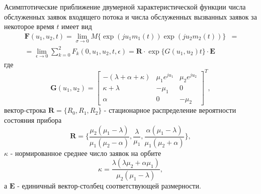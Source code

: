 \begin{theorem}
	Асимптотические приближение двумерной характеристической функции числа обслуженных заявок входящего потока и числа обслуженных вызванных заявок за некоторое время $t$ имеет вид
	\begin{equation*} \label{theorem_twodim}
		\begin{split}
			\boldsymbol{F}(u_{1},u_{2},t) =  \lim_{\sigma \xrightarrow{} 0} M\{\exp(ju_{1}m_{1}(t))\exp(ju_{2}m_{2}(t))\} &= 
			\\
			= \lim_{\epsilon \xrightarrow{} 0} \sum_{k=0}^{2}F_{k}(0,u_{1},u_{2},t,\epsilon) = \boldsymbol{R} \cdot \exp\{G(u_{1},u_{2})t\} \cdot \boldsymbol{E}
		\end{split}
	\end{equation*}
	где 
	\begin{equation*}
		\boldsymbol{G}(u_{1},u_{2})=\begin{bmatrix}
			-(\lambda + \alpha + \kappa) & \mu_{1}e^{ju_{1}} &  \mu_{2}e^{ju_{2}}\\
			\kappa+\lambda & -\mu_{1} & 0\\
			\alpha & 	0 &	-\mu_{2}
		\end{bmatrix}^{T},
	\end{equation*}
	вектор-строка $\boldsymbol{R}=\{R_{0},R_{1},R_{2}\}$ - стационарное распределение вероятности состояния прибора
	\begin{equation*}
		\boldsymbol{R}=\{\frac{\mu_{2}(\mu_{1} - \lambda)}{\mu_{1}(\mu_{2} - \alpha)},\frac{\lambda}{\mu_{1}},\frac{\alpha(\mu_{1} - \lambda)}{\mu_{1}(\mu_{2} + \alpha)}\},
	\end{equation*}
	$\kappa$ - нормированное среднее число заявок на орбите
	\begin{equation*}
		\kappa = \frac{\lambda(\lambda \mu_{2} + \alpha \mu_{1})}{\mu_{2}(\mu_{1} - \lambda)},
	\end{equation*}
	а $\boldsymbol{E}$ - единичный вектор-столбец соответствующей размерности.
\end{theorem}
